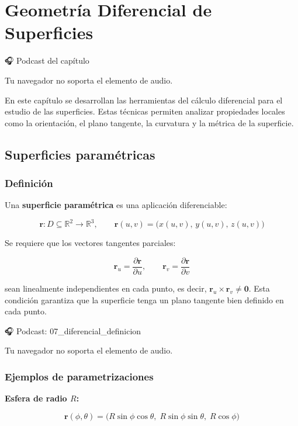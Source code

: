 \documentclass[
]{book}
\begin{document}
\chapter{Geometría Diferencial de Superficies}\label{diferencial}

🎧 Podcast del capítulo

Tu navegador no soporta el elemento de audio.

En este capítulo se desarrollan las herramientas del cálculo diferencial para el estudio de las superficies. Estas técnicas permiten analizar propiedades locales como la orientación, el plano tangente, la curvatura y la métrica de la superficie.

\section{Superficies paramétricas}\label{superficies-paramuxe9tricas}

\subsection{Definición}\label{definiciuxf3n-6}

Una \textbf{superficie paramétrica} es una aplicación diferenciable:

\[
\mathbf{r}: D \subseteq \mathbb{R}^2 \longrightarrow \mathbb{R}^3, \qquad
\mathbf{r}(u, v) = \bigl( x(u, v),\, y(u, v),\, z(u, v) \bigr)
\]

Se requiere que los vectores tangentes parciales:

\[
\mathbf{r}_u = \frac{\partial \mathbf{r}}{\partial u}, \qquad
\mathbf{r}_v = \frac{\partial \mathbf{r}}{\partial v}
\]

sean linealmente independientes en cada punto, es decir, \(\mathbf{r}_u \times \mathbf{r}_v \neq \mathbf{0}\). Esta condición garantiza que la superficie tenga un plano tangente bien definido en cada punto.

🎧 Podcast: 07\_diferencial\_definicion

Tu navegador no soporta el elemento de audio.

\subsection{Ejemplos de parametrizaciones}\label{ejemplos-de-parametrizaciones}

\textbf{Esfera de radio \(R\):}

\[
\mathbf{r}(\phi, \theta) = \bigl( R\sin\phi\cos\theta,\; R\sin\phi\sin\theta,\; R\cos\phi \bigr)
\]
\end{document}
